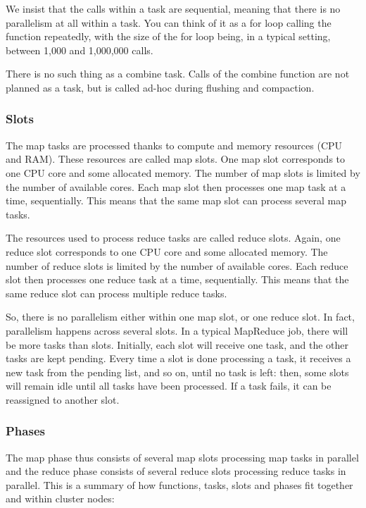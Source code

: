 We insist that the calls within a task are sequential, meaning that there is no parallelism at all within a task. You can think of it as a for loop calling the function repeatedly, with the size of the for loop being, in a typical setting, between 1,000 and 1,000,000 calls.

There is no such thing as a combine task. Calls of the combine function are not planned as a task, but is called ad-hoc during flushing and compaction.

\subsubsection{Slots}

The map tasks are processed thanks to compute and memory resources (CPU and RAM). These resources are called map slots. One map slot corresponds to one CPU core and some allocated memory. The number of map slots is limited by the number of available cores. Each map slot then processes one map task at a time, sequentially. This means that the same map slot can process several map tasks.

The resources used to process reduce tasks are called reduce slots. Again, one reduce slot corresponds to one CPU core and some allocated memory. The number of reduce slots is limited by the number of available cores. Each reduce slot then processes one reduce task at a time, sequentially. This means that the same reduce slot can process multiple reduce tasks.

So, there is no parallelism either within one map slot, or one reduce slot. In fact, parallelism happens across several slots. In a typical MapReduce job, there will be more tasks than slots. Initially, each slot will receive one task, and the other tasks are kept pending. Every time a slot is done processing a task, it receives a new task from the pending list, and so on, until no task is left: then, some slots will remain idle until all tasks have been processed. If a task fails, it can be reassigned to another slot.

\subsubsection{Phases}

The map phase thus consists of several map slots processing map tasks in parallel and the reduce phase consists of several reduce slots processing reduce tasks in parallel. This is a summary of how functions, tasks, slots and phases fit together and within cluster nodes:

